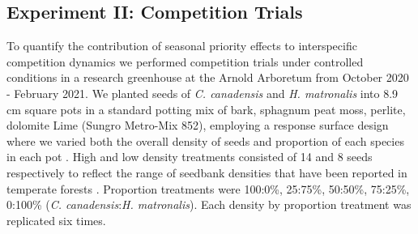 \documentclass{article}[11pt]
\begin{document}
\subsection*{Experiment II: Competition Trials}
\noindent To quantify the contribution of seasonal priority effects to interspecific competition dynamics we performed competition trials under controlled conditions in a research greenhouse at the Arnold Arboretum from October 2020 - February 2021. %
We planted seeds of \textit{C. canadensis} and \textit{H. matronalis} into 8.9 cm square pots in a standard potting mix of bark, sphagnum peat moss, perlite, dolomite Lime (Sungro Metro-Mix 852), employing a response surface design where we varied both the overall density of seeds and proportion of each species in each pot \citep{Inouye2001}. High and low density treatments consisted of 14 and 8 seeds respectively to reflect the range of seedbank densities that have been reported in temperate forests \citep{Leckie:2000tb,Bossuyt:2002un,Decocq:2004tq}. Proportion treatments were 100:0\%, 25:75\%, 50:50\%, 75:25\%, 0:100\% (\textit{C. canadensis}:\textit{H. matronalis}). Each density by proportion treatment was replicated six times. %
\end{document}
